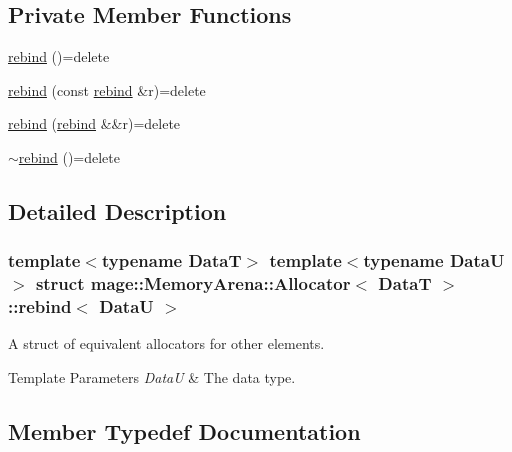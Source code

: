 \subsection*{Private Member Functions}
\begin{DoxyCompactItemize}
\item 
\hyperlink{structmage_1_1_memory_arena_1_1_allocator_1_1rebind_accff2c1aafa45e3c5cc9f5d66b4a3bb5}{rebind} ()=delete
\item 
\hyperlink{structmage_1_1_memory_arena_1_1_allocator_1_1rebind_ad1b38f344a499497a20d11f292958469}{rebind} (const \hyperlink{structmage_1_1_memory_arena_1_1_allocator_1_1rebind}{rebind} \&r)=delete
\item 
\hyperlink{structmage_1_1_memory_arena_1_1_allocator_1_1rebind_a4a59d9007e95c25e40df8771ea926619}{rebind} (\hyperlink{structmage_1_1_memory_arena_1_1_allocator_1_1rebind}{rebind} \&\&r)=delete
\item 
\hyperlink{structmage_1_1_memory_arena_1_1_allocator_1_1rebind_aa16db3ef40f7564d9079ee615239bda5}{$\sim$rebind} ()=delete
\end{DoxyCompactItemize}


\subsection{Detailed Description}
\subsubsection*{template$<$typename DataT$>$\newline
template$<$typename DataU$>$\newline
struct mage\+::\+Memory\+Arena\+::\+Allocator$<$ Data\+T $>$\+::rebind$<$ Data\+U $>$}

A struct of equivalent allocators for other elements.


\begin{DoxyTemplParams}{Template Parameters}
{\em DataU} & The data type. \\
\hline
\end{DoxyTemplParams}


\subsection{Member Typedef Documentation}
\hypertarget{structmage_1_1_memory_arena_1_1_allocator_1_1rebind_aad55bf384b9a95ae1c2158f1d2afe180}{}\label{structmage_1_1_memory_arena_1_1_allocator_1_1rebind_aad55bf384b9a95ae1c2158f1d2afe180} 
